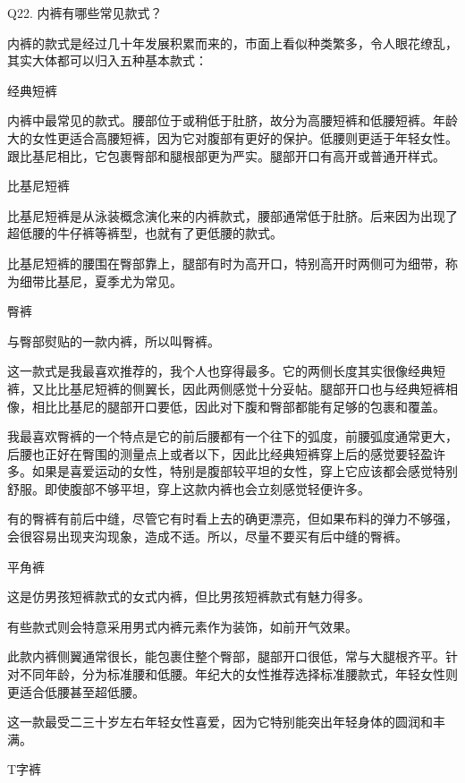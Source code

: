 \documentclass[12pt,UTF8]{ctexbook}
\begin{document}
Q22. 内裤有哪些常见款式？


内裤的款式是经过几十年发展积累而来的，市面上看似种类繁多，令人眼花缭乱，其实大体都可以归入五种基本款式：



经典短裤



内裤中最常见的款式。腰部位于或稍低于肚脐，故分为高腰短裤和低腰短裤。年龄大的女性更适合高腰短裤，因为它对腹部有更好的保护。低腰则更适于年轻女性。跟比基尼相比，它包裹臀部和腿根部更为严实。腿部开口有高开或普通开样式。

比基尼短裤



比基尼短裤是从泳装概念演化来的内裤款式，腰部通常低于肚脐。后来因为出现了超低腰的牛仔裤等裤型，也就有了更低腰的款式。

比基尼短裤的腰围在臀部靠上，腿部有时为高开口，特别高开时两侧可为细带，称为细带比基尼，夏季尤为常见。

臀裤



与臀部熨贴的一款内裤，所以叫臀裤。

这一款式是我最喜欢推荐的，我个人也穿得最多。它的两侧长度其实很像经典短裤，又比比基尼短裤的侧翼长，因此两侧感觉十分妥帖。腿部开口也与经典短裤相像，相比比基尼的腿部开口要低，因此对下腹和臀部都能有足够的包裹和覆盖。

我最喜欢臀裤的一个特点是它的前后腰都有一个往下的弧度，前腰弧度通常更大，后腰也正好在臀围的测量点上或者以下，因此比经典短裤穿上后的感觉要轻盈许多。如果是喜爱运动的女性，特别是腹部较平坦的女性，穿上它应该都会感觉特别舒服。即使腹部不够平坦，穿上这款内裤也会立刻感觉轻便许多。

有的臀裤有前后中缝，尽管它有时看上去的确更漂亮，但如果布料的弹力不够强，会很容易出现夹沟现象，造成不适。所以，尽量不要买有后中缝的臀裤。

平角裤

这是仿男孩短裤款式的女式内裤，但比男孩短裤款式有魅力得多。



有些款式则会特意采用男式内裤元素作为装饰，如前开气效果。



此款内裤侧翼通常很长，能包裹住整个臀部，腿部开口很低，常与大腿根齐平。针对不同年龄，分为标准腰和低腰。年纪大的女性推荐选择标准腰款式，年轻女性则更适合低腰甚至超低腰。

这一款最受二三十岁左右年轻女性喜爱，因为它特别能突出年轻身体的圆润和丰满。

T字裤
\end{document}
